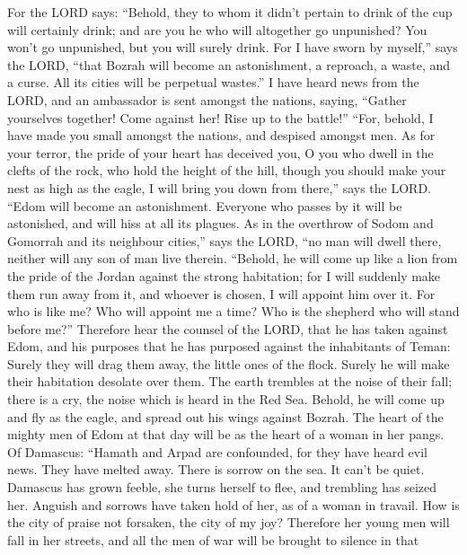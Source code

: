  For the LORD says: ``Behold, they to whom it didn't
pertain to drink of the cup will certainly drink; and are you he who
will altogether go unpunished? You won't go unpunished, but you will
surely drink.  For I have sworn by myself,'' says the LORD,
``that Bozrah will become an astonishment, a reproach, a waste, and a
curse. All its cities will be perpetual wastes.''  I have
heard news from the LORD, and an ambassador is sent amongst the nations,
saying, ``Gather yourselves together! Come against her! Rise up to the
battle!''  ``For, behold, I have made you small amongst the
nations, and despised amongst men.  As for your terror, the
pride of your heart has deceived you, O you who dwell in the clefts of
the rock, who hold the height of the hill, though you should make your
nest as high as the eagle, I will bring you down from there,'' says the
LORD.  ``Edom will become an astonishment. Everyone who
passes by it will be astonished, and will hiss at all its plagues.
 As in the overthrow of Sodom and Gomorrah and its
neighbour cities,'' says the LORD, ``no man will dwell there, neither
will any son of man live therein.  ``Behold, he will come
up like a lion from the pride of the Jordan against the strong
habitation; for I will suddenly make them run away from it, and whoever
is chosen, I will appoint him over it. For who is like me? Who will
appoint me a time? Who is the shepherd who will stand before me?''
 Therefore hear the counsel of the LORD, that he has taken
against Edom, and his purposes that he has purposed against the
inhabitants of Teman: Surely they will drag them away, the little ones
of the flock. Surely he will make their habitation desolate over them.
 The earth trembles at the noise of their fall; there is a
cry, the noise which is heard in the Red Sea.  Behold, he
will come up and fly as the eagle, and spread out his wings against
Bozrah. The heart of the mighty men of Edom at that day will be as the
heart of a woman in her pangs.  Of Damascus: ``Hamath and
Arpad are confounded, for they have heard evil news. They have melted
away. There is sorrow on the sea. It can't be quiet. 
Damascus has grown feeble, she turns herself to flee, and trembling has
seized her. Anguish and sorrows have taken hold of her, as of a woman in
travail.  How is the city of praise not forsaken, the city
of my joy?  Therefore her young men will fall in her
streets, and all the men of war will be brought to silence in that
